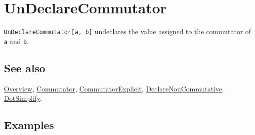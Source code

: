 \documentclass[../FeynCalcManual.tex]{subfiles}
\begin{document}
\hypertarget{undeclarecommutator}{%
\section{UnDeclareCommutator}\label{undeclarecommutator}}

\texttt{UnDeclareCommutator[\allowbreak{}a,\ \allowbreak{}b]} undeclares
the value assigned to the commutator of \texttt{a} and \texttt{b}.

\subsection{See also}

\hyperlink{toc}{Overview}, \hyperlink{commutator}{Commutator},
\hyperlink{commutatorexplicit}{CommutatorExplicit},
\hyperlink{declarenoncommutative}{DeclareNonCommutative},
\hyperlink{dotsimplify}{DotSimplify}.

\subsection{Examples}

\begin{Shaded}
\begin{Highlighting}[]
\OperatorTok{[}\OperatorTok{[}\OperatorTok{[}\OperatorTok{[}\OperatorTok{]],} \OperatorTok{],}\OperatorTok{[}\OperatorTok{]]} \ExtensionTok{=} \NormalTok{;}
\end{Highlighting}
\end{Shaded}

\begin{Shaded}
\begin{Highlighting}[]
\OperatorTok{[}\OperatorTok{]}\OperatorTok{[}\OperatorTok{]}\OperatorTok{[}\SpecialCharTok{\textbackslash{}}\OperatorTok{[}\OperatorTok{]]}\OperatorTok{[}\OperatorTok{]}\OperatorTok{[}\OperatorTok{]}\OperatorTok{[}\SpecialCharTok{\textbackslash{}}\OperatorTok{[}\OperatorTok{]]} 
 
\OperatorTok{[}\SpecialCharTok{\%}\OperatorTok{]}
\end{Highlighting}
\end{Shaded}
\end{document}
